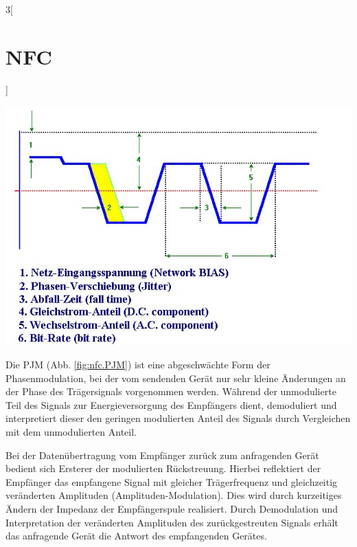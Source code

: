 \begin{multicols}{3}[\section{NFC}]
\begin{Figure}
\includegraphics[width=\linewidth]{Kapitel/NFC/Grafiken/PJM.jpg}
\label{fig:nfc.PJM}
\end{Figure}

Die PJM (Abb. \ref{fig:nfc.PJM}) ist eine abgeschwächte Form der Phasenmodulation, bei der vom sendenden Gerät nur sehr kleine Änderungen an der Phase des Trägersignals vorgenommen werden. Während der unmodulierte Teil des Signals zur Energieversorgung des Empfängers dient, demoduliert und interpretiert dieser den geringen modulierten Anteil des Signals durch Vergleichen mit dem unmodulierten Anteil. 

Bei der Datenübertragung vom Empfänger zurück zum anfragenden Gerät bedient sich Ersterer der modulierten Rückstreuung. Hierbei reflektiert der Empfänger das empfangene Signal mit gleicher Trägerfrequenz und gleichzeitig veränderten Amplituden (Amplituden-Modulation). Dies wird durch kurzeitiges Ändern der Impedanz der Empfängerspule realisiert. Durch Demodulation und Interpretation der veränderten Amplituden des zurückgestreuten Signals erhält das anfragende Gerät die Antwort des empfangenden Gerätes.~\cite{nfc.3,nfc.4,nfc.5,nfc.6,nfc.7,nfc.8}



\end{multicols}
